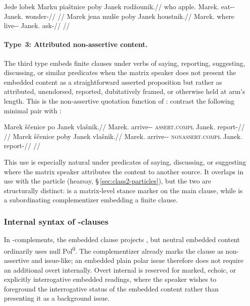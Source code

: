 \pex
\a
\begingl
\gla Jede lobek Marku piaštnice poby Janek rodžounik.//
\glb who apple.\Dir{} Marek.\Trs{} eat-\Pf{}-\Lnk{} \Compl{} Janek.\Dir{} wonder-\Cont{}//
\glft {} //
\endgl
\a
\begingl
\gla Marek jena mulše poby Janek houstnik.//
\glb Marek.\Dir{} where live-\Cont{}-\Lnk{} \Compl{} Janek.\Trs{} ask-\Pf{}//
\glft {} //
\endgl
\xe

\paragraph{Type~3: Attributed non-assertive content.}
The third type embeds finite clauses under verbs of saying, reporting,
suggesting, discussing, or similar predicates when the matrix speaker does not
present the embedded content as a straightforward asserted proposition but
rather as attributed, unendorsed, reported, dubitatively framed, or otherwise
held at arm's length. This is the non-assertive quotation function of
: contrast the following minimal pair with :

\pex
\a
\begingl
\gla Marek ščenice po Janek vlašnik.//
\glb Marek.\Dir{} arrive-\Pf{}-\Lnk{} \textsc{assert.compl} Janek.\Dir{} report-\Pf{}//
\glft {} //
\endgl
\a
\begingl
\gla Marek ščenice poby Janek vlašnik.//
\glb Marek.\Dir{} arrive-\Pf{}-\Lnk{} \textsc{nonassert.compl} Janek.\Dir{} report-\Pf{}//
\glft {} //
\endgl
\xe

\noindent This use is especially natural under predicates of saying,
discussing, or suggesting where the matrix speaker attributes the content to
another source. It overlaps in use with the particle  (hearsay,
§\,\ref{sec:class2-particles}), but the two are structurally distinct: 
is a matrix-level stance marker on the main clause, while  is a
subordinating complementizer embedding a finite clause.

\subsubsection{Internal syntax of -clauses}

In -complements, the embedded clause projects , but
neutral embedded content ordinarily uses null Pol\textsuperscript{0}. The
complementizer  already marks the clause as non-assertive and
issue-like; an embedded plain polar issue therefore does not require an
additional overt  internally. Overt internal  is reserved for
marked, echoic, or explicitly interrogative embedded readings, where the
speaker wishes to foreground the interrogative status of the embedded content
rather than presenting it as a background issue.

